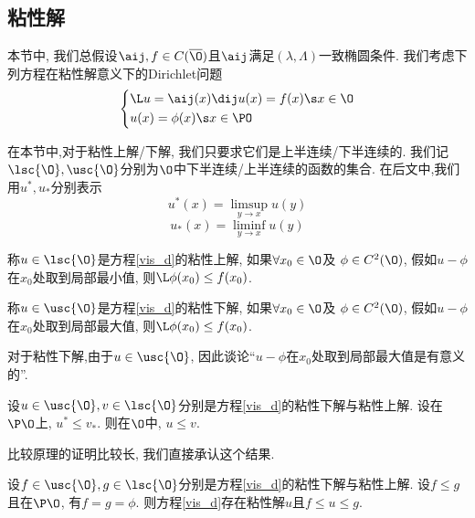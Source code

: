 \subsection{粘性解}
本节中, 我们总假设$\aij, f \in C(\overline{\O})$且$\aij$满足$(\lambda,\Lambda)$一致椭圆条件. 我们考虑下列方程在粘性解意义下的Dirichlet问题
\begin{equation} \label{vis_d}
    \left\{
        \begin{aligned}
            &\L u=\aij(x) \dij u(x)=f(x) \s x \in \O\\
            &u(x)=\phi(x) \s x \in \PO
        \end{aligned}
    \right.
\end{equation}
\par 在本节中,对于粘性上解/下解, 我们只要求它们是上半连续/下半连续的. 我们记$\lsc{\O}, \usc{\O}$分别为$\O$中下半连续/上半连续的函数的集合. 在后文中,我们用$u^*, u_*$分别表示
\begin{equation}
    u^*(x)=\limsup_{y\to x}u(y)
\end{equation}
\begin{equation}
    u_*(x)=\liminf_{y\to x}u(y)
\end{equation}
\begin{definition} \label{def_viscosity_sup}
    称$u \in \lsc{\O}$是方程\eqref{vis_d}的粘性上解, 如果$\forall x_0 \in \O$及 $\phi \in C^2(\O)$, 假如$u-\phi$在$x_0$处取到局部最小值, 则$\L \phi(x_0) \le f(x_0)$.  
\end{definition}
\begin{definition} \label{def_viscosity_sub}
    称$u \in \usc{\O}$是方程\eqref{vis_d}的粘性下解, 如果$\forall x_0 \in \O$及 $\phi \in C^2(\O)$, 假如$u-\phi$在$x_0$处取到局部最大值, 则$\L \phi(x_0) \le f(x_0)$.  
\end{definition}
\begin{remark}
    对于粘性下解,由于$u \in \usc{\O}$, 因此谈论``$u-\phi$在$x_0$处取到局部最大值是有意义的''.
\end{remark}
\begin{theorem}[粘性解的比较原理] \label{vis_comp}
    设$u \in \usc{\O}, v \in \lsc{\O}$分别是方程\eqref{vis_d}的粘性下解与粘性上解. 设在$\P \O$上, $u^* \le v_*$. 则在$\O$中, $u \le v$.
\end{theorem}
比较原理的证明比较长, 我们直接承认这个结果.
\begin{theorem} \label{vis_e}
    设$f \in \usc{\O}, g \in \lsc{\O}$分别是方程\eqref{vis_d}的粘性下解与粘性上解. 设$f \le g$且在$\P \O$, 有$f=g=\phi$. 则方程\eqref{vis_d}存在粘性解$u$且$f \le u \le g$.
\end{theorem}
